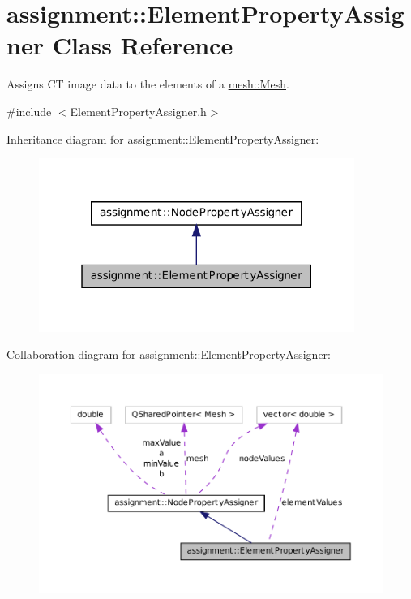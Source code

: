 \hypertarget{classassignment_1_1_element_property_assigner}{
\section{assignment::ElementPropertyAssigner Class Reference}
\label{classassignment_1_1_element_property_assigner}
}


Assigns CT image data to the elements of a \hyperlink{classmesh_1_1_mesh}{mesh::Mesh}.  




{\ttfamily \#include $<$ElementPropertyAssigner.h$>$}



Inheritance diagram for assignment::ElementPropertyAssigner:\nopagebreak
\begin{figure}[H]
\begin{center}
\leavevmode
\includegraphics[width=292pt]{classassignment_1_1_element_property_assigner__inherit__graph}
\end{center}
\end{figure}


Collaboration diagram for assignment::ElementPropertyAssigner:\nopagebreak
\begin{figure}[H]
\begin{center}
\leavevmode
\includegraphics[width=400pt]{classassignment_1_1_element_property_assigner__coll__graph}
\end{center}
\end{figure}
